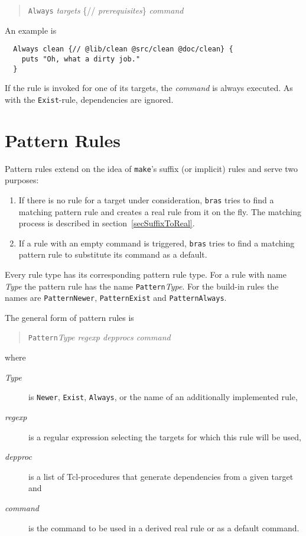 \documentclass[12pt]{article}
\newcommand{\bras}{\texttt{bras}}
\newcommand{\make}{\texttt{make}}
\begin{document}
\begin{quote}
  \texttt{Always} \textit{targets} \{// \textit{prerequisites}\} \textit{command}
\end{quote}

An example is
\begin{verbatim}
  Always clean {// @lib/clean @src/clean @doc/clean} {
    puts "Oh, what a dirty job."
  }
\end{verbatim}

If the rule is invoked for one of its targets, the \textit{command} is
always executed. As with the \texttt{Exist}-rule,
dependencies are ignored.


\section{Pattern Rules}

Pattern rules extend on the idea of \make's suffix (or implicit)
rules and serve two purposes:

\begin{enumerate}
\item If there is no rule for a target under consideration, \bras{}
tries to find a matching pattern rule and creates a real rule from it on
the fly. The matching process is described in
section~\ref{secSuffixToReal}.
\item If a rule with an empty command is triggered, \bras{} tries
to find a matching pattern rule to substitute its command as a default.
\end{enumerate}

Every rule type has its corresponding pattern rule type. 
For a rule with name \textit{Type} the pattern rule has the name
\texttt{Pattern}\textit{Type}. For the build-in rules the names are
\texttt{PatternNewer}, \texttt{PatternExist} and
\texttt{PatternAlways}.

The general form of pattern rules is
\begin{quote}
\texttt{Pattern}\textit{Type regexp depprocs command}
\end{quote}

where 

\begin{description}
\item[\textit{Type}] is \texttt{Newer}, \texttt{Exist},
\texttt{Always}, or the name of an additionally implemented rule,
\item[\textit{regexp}] is a regular expression selecting the targets
for which this rule will be used,
\item[\textit{depproc}] is a list of Tcl-procedures that generate
dependencies from a given target and
\item[\textit{command}] is the command to be used in a derived real
rule or as a default command.
\end{description}
\end{document}
